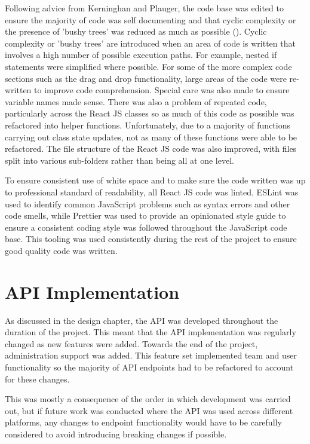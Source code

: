 \documentclass[l4proj.tex]{subfiles}
\begin{document}
 Following advice from Kerninghan and Plauger, the code base was edited to ensure the majority of code was self documenting and that cyclic complexity or the presence of 'bushy trees' was reduced as much as possible (\cite{Kernignhan1974}). Cyclic complexity or 'bushy trees' are introduced when an area of code is written that involves a high number of possible execution paths. For example, nested if statements were simplified where possible. For some of the more complex code sections such as the drag and drop functionality, large areas of the code were re-written to improve code comprehension. Special care was also made to ensure variable names made sense. There was also a problem of repeated code, particularly across the React JS classes so as much of this code as possible was refactored into helper functions. Unfortunately, due to a majority of functions carrying out class state updates, not as many of these functions were able to be refactored. The file structure of the React JS code was also improved, with files split into various sub-folders rather than being all at one level. 

 To ensure consistent use of white space and to make sure the code written was up to professional standard of readability, all React JS code was linted. ESLint was used to identify common JavaScript problems such as syntax errors and other code smells, while Prettier was used to provide an opinionated style guide to ensure a consistent coding style was followed throughout the JavaScript code base. This tooling was used consistently during the rest of the project to ensure good quality code was written.


\section{API Implementation}
As discussed in the design chapter, the API was developed throughout the duration of the project. This meant that the API implementation was regularly changed as new features were added. Towards the end of the project, administration support was added. This feature set implemented team and user functionality so the majority of API endpoints had to be refactored to account for these changes. 

This was mostly a consequence of the order in which development was carried out, but if future work was conducted where the API was used across different platforms, any changes to endpoint functionality would have to be carefully considered to avoid introducing breaking changes if possible.
\end{document}
